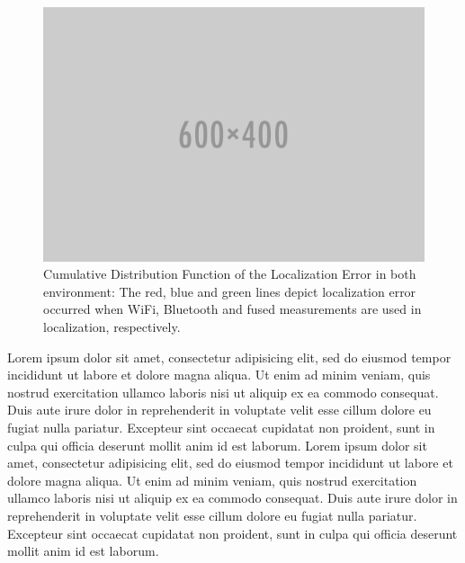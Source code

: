     \begin{figure}[thpb]
        \centering
        \includegraphics[width=\linewidth]{figures/placeholder.png}
        \caption{\label{fig:cdf}Cumulative Distribution Function of the Localization Error in both environment: The red, blue and green lines depict localization error occurred when WiFi, Bluetooth and fused measurements are used in localization, respectively.}
    \end{figure}
    Lorem ipsum dolor sit amet, consectetur adipisicing elit, sed do eiusmod tempor incididunt ut labore et dolore magna aliqua. Ut enim ad minim veniam, quis nostrud exercitation ullamco laboris nisi ut aliquip ex ea commodo consequat. Duis aute irure dolor in reprehenderit in voluptate velit esse cillum dolore eu fugiat nulla pariatur. Excepteur sint occaecat cupidatat non proident, sunt in culpa qui officia deserunt mollit anim id est laborum.
    Lorem ipsum dolor sit amet, consectetur adipisicing elit, sed do eiusmod tempor incididunt ut labore et dolore magna aliqua. Ut enim ad minim veniam, quis nostrud exercitation ullamco laboris nisi ut aliquip ex ea commodo consequat. Duis aute irure dolor in reprehenderit in voluptate velit esse cillum dolore eu fugiat nulla pariatur. Excepteur sint occaecat cupidatat non proident, sunt in culpa qui officia deserunt mollit anim id est laborum.
